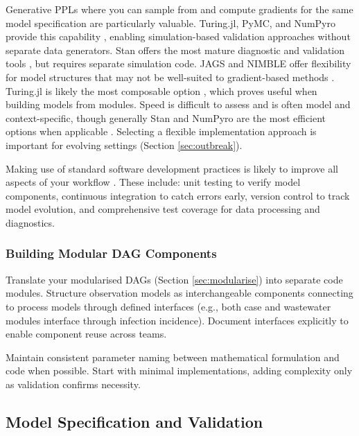 \documentclass{article}
\begin{document}
Generative PPLs where you can sample from and compute gradients for the same model specification are particularly valuable.
Turing.jl, PyMC, and NumPyro provide this capability \citep{ge2018turing,fjelde2025turing,abril2023pymc,phan2019composable}, enabling simulation-based validation approaches without separate data generators.
Stan offers the most mature diagnostic and validation tools \citep{carpenter2017stan} , but requires separate simulation code.
JAGS and NIMBLE offer flexibility for model structures that may not be well-suited to gradient-based methods \citep{plummer2003jags,valpine2017programming}.
Turing.jl is likely the most composable option \citep{ge2018turing}, which proves useful when building models from modules.
Speed is difficult to assess and is often model and context-specific, though generally Stan and NumPyro are the most efficient options when applicable \citep{carpenter2017stan,phan2019composable}.
Selecting a flexible implementation approach is important for evolving settings (Section \ref{sec:outbreak}).

Making use of standard software development practices is likely to improve all aspects of your workflow \citep{gelman2020bayesian}.
These include: unit testing to verify model components, continuous integration to catch errors early, version control to track model evolution, and comprehensive test coverage for data processing and diagnostics.

\subsubsection{Building Modular DAG Components}

Translate your modularised DAGs (Section \ref{sec:modularise}) into separate code modules.
Structure observation models as interchangeable components connecting to process models through defined interfaces (e.g., both case and wastewater modules interface through infection incidence).
Document interfaces explicitly to enable component reuse across teams.

Maintain consistent parameter naming between mathematical formulation and code when possible.
Start with minimal implementations, adding complexity only as validation confirms necessity.

\subsection{Model Specification and Validation}\label{sec:spec-validate}
\end{document}

